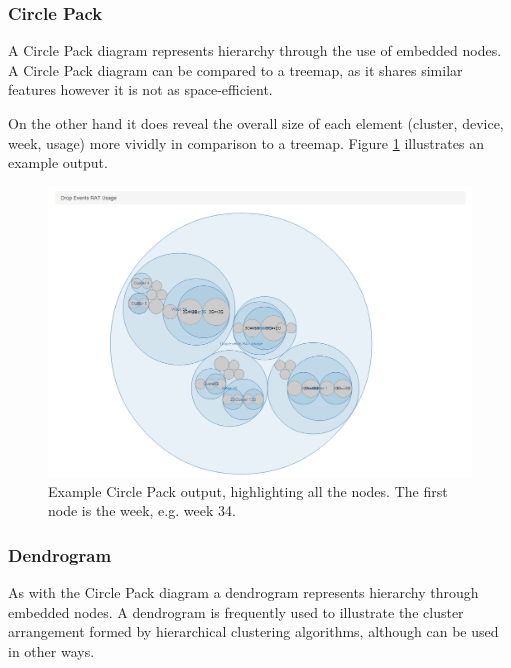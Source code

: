 \newpage
\subsubsection{Circle Pack}
A Circle Pack diagram represents hierarchy through the use of embedded nodes. 
A Circle Pack diagram can be compared to a treemap, as it shares similar 
features however it is not as space-efficient. 

On the other hand it does reveal the overall size of each element (cluster, 
device, week, usage) more vividly in comparison to a treemap. Figure 
\ref{fig:circle_pack} illustrates an example output.

\begin{landscape}
  \centering 
    \begin{figure}[H]
      \centering
        \includegraphics[scale=0.65]{chapter8/visualisation/circle_pack.png}
        \caption[Example Circle Pack output]
                {Example Circle Pack output, highlighting all the nodes. The 
               first node is the week, e.g. week 34.}
        \label{fig:circle_pack}
    \end{figure}
\end{landscape}


\newpage
\subsubsection{Dendrogram}

As with the Circle Pack diagram a dendrogram represents hierarchy through 
embedded nodes. A dendrogram is frequently used to illustrate the cluster 
arrangement formed by hierarchical clustering algorithms, although can be used 
in other ways.

